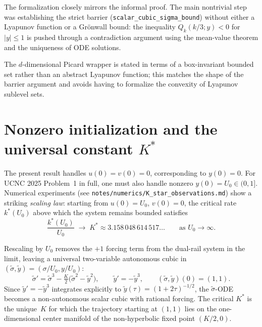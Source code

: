 \documentclass[11pt]{article}
\begin{document}
The formalization closely mirrors the informal proof.  The main nontrivial
step was establishing the strict barrier
(\texttt{scalar\_cubic\_sigma\_bound}) without either a Lyapunov function or a
Gr\"onwall bound: the inequality $Q_{k}(k/3; y) < 0$ for $|y| \le 1$ is pushed
through a contradiction argument using the mean-value theorem and the
uniqueness of ODE solutions.

The $d$-dimensional Picard wrapper is stated in terms of a box-invariant
bounded set rather than an abstract Lyapunov function; this matches the shape
of the barrier argument and avoids having to formalize the convexity of
Lyapunov sublevel sets.

\section{Nonzero initialization and the universal constant $K^{*}$}
\label{sec:kstar}

The present result handles $u(0) = v(0) = 0$, corresponding to $y(0) = 0$.  For
UCNC 2025 Problem~1 in full, one must also handle nonzero $y(0) = U_{0} \in
(0, 1]$.  Numerical experiments (see \texttt{notes/numerics/K\_star\_observations.md})
show a striking \emph{scaling law}: starting from $u(0) = U_{0}$, $v(0) = 0$,
the critical rate $k^{*}(U_{0})$ above which the system remains bounded
satisfies
\begin{equation}\label{eq:Kstar-scaling}
  \frac{k^{*}(U_{0})}{U_{0}} \;\longrightarrow\; K^{*} \approx 3.158\,048\,614\,517\ldots
  \qquad \text{as } U_{0} \to \infty.
\end{equation}

Rescaling by $U_{0}$ removes the $+1$ forcing term from the dual-rail system in
the limit, leaving a universal two-variable autonomous cubic in
$(\tilde{\sigma}, \tilde{y}) = (\sigma/U_{0}, y/U_{0})$:
\[
  \tilde{\sigma}' = \tilde{\sigma}^{3} - \tfrac{K}{2}\bigl(\tilde{\sigma}^{2} - \tilde{y}^{2}\bigr),
  \qquad
  \tilde{y}' = -\tilde{y}^{3},
  \qquad
  (\tilde{\sigma}, \tilde{y})(0) = (1, 1).
\]
Since $\tilde{y}' = -\tilde{y}^{3}$ integrates explicitly to
$\tilde{y}(\tau) = (1 + 2\tau)^{-1/2}$, the $\tilde{\sigma}$-ODE becomes a
non-autonomous scalar cubic with rational forcing.  The critical $K^{*}$ is
the unique~$K$ for which the trajectory starting at $(1, 1)$ lies on the
one-dimensional center manifold of the non-hyperbolic fixed point $(K/2, 0)$.
\end{document}
